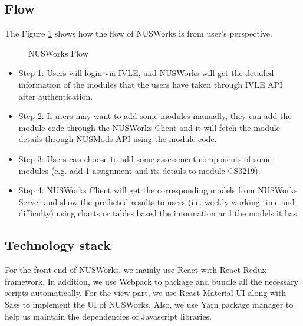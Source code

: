 \documentclass[fyp]{socreport}
\begin{document}
\subsection{Flow}
The Figure {\ref{flow}} shows how the flow of NUSWorks is from user’s perspective.

\begin{figure}
\caption{NUSWorks Flow}
\label{flow}
\end{figure}

\begin{itemize}
  \item Step 1: Users will login via IVLE, and NUSWorks will get the detailed information of the modules that the users have taken through IVLE API after authentication.
  \item Step 2: If users may want to add some modules manually, they can add the module code through the NUSWorks Client and it will fetch the module details through NUSMods API using the module code.
	\item Step 3: Users can choose to add some assessment components of some modules (e.g. add 1 assignment and its details to module CS3219).
	\item Step 4: NUSWorks Client will get the corresponding models from NUSWorks Server and show the predicted results to users (i.e. weekly working time and difficulty) using charts or tables based the information and the models it has.
\end{itemize}

\subsection{Technology stack}
For the front end of NUSWorks, we mainly use React with React-Redux framework. In addition, we use Webpack to package and bundle all the necessary scripts automatically. For the view part, we use React Material UI along with Sass to implement the UI of NUSWorks. Also, we use Yarn package manager to help us maintain the dependencies of Javascript libraries.
\end{document}

